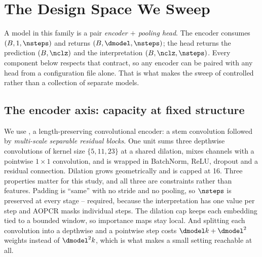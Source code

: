 %

\section{The Design Space We Sweep}
\label{sec:design}

A model in this family is a pair \emph{encoder $+$ pooling head}. The encoder consumes
$(B,1,\nsteps)$ and returns $(B,\dmodel,\nsteps)$; the head returns the prediction $(B,\nclz)$ and
the interpretation $(B,\nclz,\nsteps)$. Every component below respects that contract, so any encoder
can be paired with any head from a configuration file alone. That is what makes the sweep of
 controlled rather than a collection of separate models.

\subsection{The encoder axis: capacity at fixed structure}
\label{sec:design:enc}

We use \seanet{}, a length-preserving convolutional encoder: a stem convolution followed by
\emph{multi-scale separable residual blocks}. One unit sums three depthwise convolutions of kernel
size $\{5,11,23\}$ at a shared dilation, mixes channels with a pointwise $1\times1$ convolution, and
is wrapped in BatchNorm, ReLU, dropout and a residual connection. Dilation grows geometrically and
is capped at 16. Three properties matter for this study, and all three are constraints rather than
features. Padding is ``same'' with no stride and no pooling, so $\nsteps$ is preserved at every
stage -- required, because the interpretation has one value per step and AOPCR masks individual
steps. The dilation cap keeps each embedding tied to a bounded window, so importance maps stay
local. And splitting each convolution into a depthwise and a pointwise step
\citep{chollet2017xception, howard2017mobilenets} costs $\dmodel k + \dmodel^2$ weights instead of
$\dmodel^2 k$, which is what makes a small setting reachable at all.

